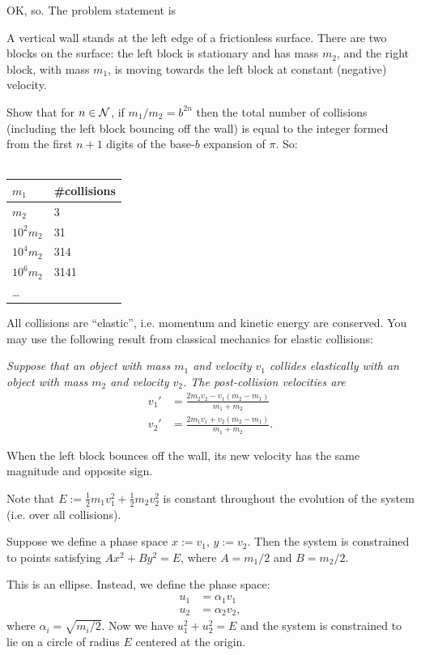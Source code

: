 OK, so. The problem statement is
\begin{mdframed}
  A vertical wall stands at the left edge of a frictionless surface. There are two blocks on the
  surface: the left block is stationary and has mass $m_2$, and the right block, with mass $m_1$, is
  moving towards the left block at constant (negative) velocity.

  Show that for $n \in \mathcal{N}$, if $m_1/m_2 = b^{2n}$ then the total number of collisions (including the
  left block bouncing off the wall) is equal to the integer formed from the first $n+1$ digits
  of the base-$b$ expansion of $\pi$. So:\\~\\
  \begin{tabular}{l|l}
    $m_1$ & \#collisions \\
    \hline
    $m_2$        & 3 \\
    $10^2m_2$     & 31 \\
    $10^4m_2$   & 314 \\
    $10^6m_2$ & 3141 \\
    \ldots
  \end{tabular}

  All collisions are ``elastic'', i.e. momentum and kinetic energy are conserved. You may use the
  following result from classical mechanics for elastic collisions:

  \textit{Suppose that an object with mass $m_1$ and velocity $v_1$ collides elastically with an
    object with mass $m_2$ and velocity $v_2$. The post-collision velocities are
    \begin{align*}
      v_1' &= \frac{2m_2v_2 - v_1(m_2 - m_1)}{m_1 + m_2} \\
      v_2' &= \frac{2m_1v_1 + v_2(m_2 - m_1)}{m_1 + m_2}.
    \end{align*}
  }

  When the left block bounces off the wall, its new velocity has the same magnitude and opposite
  sign.
\end{mdframed}

Note that $E := \frac{1}{2}m_1v_1^2 + \frac{1}{2}m_2v_2^2$ is constant throughout the evolution of
the system (i.e. over all collisions).

Suppose we define a phase space $x := v_1$, $y := v_2$. Then the system is constrained to points
satisfying $Ax^2 + By^2 = E$, where $A = m_1/2$ and $B = m_2/2$.

This is an ellipse. Instead, we define the phase space:
\begin{align*}
  u_1 &= \alpha_1v_1 \\
  u_2 &= \alpha_2v_2,
\end{align*}
where $\alpha_i = \sqrt{m_i/2}$.
Now we have $u_1^2 + u_2^2 = E$ and the system is constrained to lie on a circle of radius $E$ centered
at the origin.

